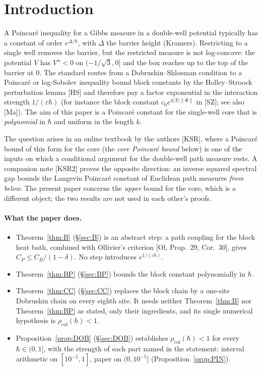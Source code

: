 \documentclass[11pt,a4paper]{article}
\theoremstyle{definition}
\theoremstyle{remark}
\newcommand{\rcol}{\rho_{\mathrm{col}}}
\begin{document}
\section{Introduction}\label{sec:intro}

A Poincar\'e inequality for a Gibbs measure in a double-well potential typically has a constant of order $e^{\Delta/\hbar}$, with $\Delta$ the barrier height (Kramers). Restricting to a single well removes the barrier, but the restricted measure is not log-concave: the potential $V$ has $V''<0$ on $(-1/\sqrt3,0]$ and the box reaches up to the top of the barrier at $0$. The standard routes from a Dobrushin--Shlosman condition to a Poincar\'e or log-Sobolev inequality bound block constants by the Holley--Stroock perturbation lemma [HS] and therefore pay a factor exponential in the interaction strength $1/(\varepsilon\hbar)$ (for instance the block constant $c_0e^{4|X|\|\Phi\|}$ in [SZ]; see also [Ma]). The aim of this paper is a Poincar\'e constant for the single-well core that is \emph{polynomial} in $\hbar$ and uniform in the length $k$.

The question arises in an online textbook by the authors [KSR], where a Poincar\'e bound of this form for the core (the \emph{core Poincar\'e bound} below) is one of the inputs on which a conditional argument for the double-well path measure rests. A companion note [KSR2] proves the opposite direction: an inverse squared spectral gap bounds the Langevin Poincar\'e constant of Euclidean path measures \emph{from below}. The present paper concerns the \emph{upper} bound for the core, which is a different object; the two results are not used in each other's proofs.

\paragraph{What the paper does.}
\begin{itemize}[leftmargin=*]
\item Theorem~\ref{thm:B} (\S\ref{sec:B}) is an abstract step: a path coupling for the block heat bath, combined with Ollivier's criterion [Ol, Prop.~29, Cor.~30], gives $C_P\le C_B/(1-\delta)$. No step introduces $e^{1/(\varepsilon\hbar)}$.
\item Theorem~\ref{thm:BP} (\S\ref{sec:BP}) bounds the block constant polynomially in $\hbar$.
\item Theorem~\ref{thm:CC} (\S\ref{sec:CC}) replaces the block chain by a one-site Dobrushin chain on every eighth site. It needs neither Theorem~\ref{thm:B} nor Theorem~\ref{thm:BP} as stated, only their ingredients, and its single numerical hypothesis is $\rcol(\hbar)<1$.
\item Proposition~\ref{prop:DOB} (\S\ref{sec:DOB}) establishes $\rcol(\hbar)<1$ for every $\hbar\in(0,1]$, with the strength of each part named in the statement: interval arithmetic on $[10^{-5},1]$, paper on $(0,10^{-5}]$ (Proposition~\ref{prop:PIN}).
\end{itemize}
\end{document}
